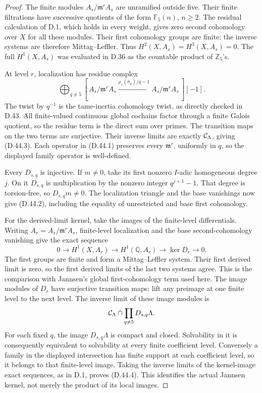 \begin{proof}
The finite modules \(A_s/\mathfrak m^rA_s\) are
unramified outside five. Their finite filtrations
have successive quotients of the form
\(\mathbb F_5(n)\), \(n\ge2\).
The residual calculation of D.1, which holds
in every weight, gives zero second cohomology
over \(X\) for all these modules. Their first
cohomology groups are finite; the inverse
systems are therefore Mittag--Leffler.
Thus \(H^2(X,A_s)=H^3(X,A_s)=0\).
The full \(H^1(X,A_s)\) was evaluated in
D.36 as the countable product of \(\mathbb Z_5\)'s.

At level \(r\), localization has residue
complex
\[
 \bigoplus_{q\ne5}
 [\,A_s/\mathfrak m^rA_s
        \xrightarrow{\rho_s(\sigma_q)/q-1}
                         A_s/\mathfrak m^rA_s\,][-1].
\]
The twist by \(q^{-1}\) is the tame-inertia
cohomology twist, as directly checked in D.43.
All finite-valued continuous global cochains
factor through a finite Galois quotient, so
the residue term is the direct sum over primes.
The transition maps on the two terms are
surjective. Their inverse limits are exactly
\({\cal C}_\Lambda\), giving (D.44.3).
Each operator in (D.44.1) preserves every
\(\mathfrak m^r\), uniformly in \(q\), so
the displayed family operator is well-defined.

Every \(D_{s,q}\) is injective. If \(m\ne0\),
take its first nonzero \(I\)-adic homogeneous
degree \(j\). On it \(D_{s,q}\) is
multiplication by the nonzero integer
\(q^{j+1}-1\). That degree is torsion-free,
so \(D_{s,q}m\ne0\).
The localization triangle and the base
vanishings now give (D.44.2), including
the equality of unrestricted and base
first cohomology.

For the derived-limit kernel, take the
images of the finite-level differentials.
Writing \(A_r=A_s/\mathfrak m^rA_s\), finite-level
localization and the base second-cohomology
vanishing give the exact sequence
\[
 0\longrightarrow H^1(X,A_r)
 \longrightarrow H^1(\mathbb Q,A_r)
 \longrightarrow\ker D_r\longrightarrow0 .
\]
The first groups are finite and form a
Mittag--Leffler system. Their first derived
limit is zero, so the first derived limits
of the last two systems agree.
This is the comparison with Jannsen's
global first-cohomology term used here.
The image modules of \(D_r\) have
surjective transition maps:
lift any preimage at one finite level to
the next level. The inverse limit of
these image modules is
\[
                 {\cal C}_\Lambda
                     \cap\prod_{q\ne5}D_{s,q}\Lambda.
\]
For each fixed \(q\), the image
\(D_{s,q}\Lambda\) is compact and closed.
Solvability in it is consequently equivalent
to solvability at every finite coefficient
level. Conversely a family in the displayed
intersection has finite support at each
coefficient level, so it belongs to that
finite-level image. Taking the inverse
limits of the kernel-image exact sequences,
as in D.1, proves (D.44.4).
This identifies the actual Jannsen kernel,
not merely the product of its local images.


\end{proof}
